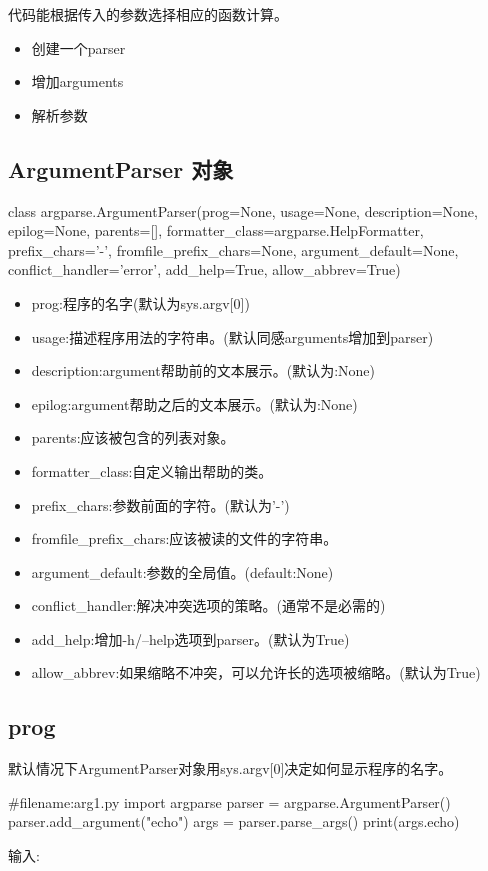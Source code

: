 \begin{python}
代码能根据传入的参数选择相应的函数计算。
\begin{itemize}
\item 创建一个parser
\item 增加arguments
\item 解析参数
\end{itemize}
\subsection{ArgumentParser 对象}
class argparse.ArgumentParser(prog=None, usage=None, description=None, epilog=None, parents=[], formatter\_class=argparse.HelpFormatter, prefix\_chars='-', fromfile\_prefix\_chars=None, argument\_default=None, conflict\_handler='error', add\_help=True, allow\_abbrev=True)
\begin{itemize}
\item prog:程序的名字(默认为sys.argv[0])
\item usage:描述程序用法的字符串。(默认同感arguments增加到parser)
\item description:argument帮助前的文本展示。(默认为:None)
\item epilog:argument帮助之后的文本展示。(默认为:None)
\item parents:应该被包含的列表对象。
\item formatter\_class:自定义输出帮助的类。
\item prefix\_chars:参数前面的字符。(默认为'-')
\item fromfile\_prefix\_chars:应该被读的文件的字符串。
\item argument\_default:参数的全局值。(default:None)
\item conflict\_handler:解决冲突选项的策略。(通常不是必需的)
\item add\_help:增加-h/--help选项到parser。(默认为True)
\item allow\_abbrev:如果缩略不冲突，可以允许长的选项被缩略。(默认为True)
\end{itemize}
\subsection{prog}
默认情况下ArgumentParser对象用sys.argv[0]决定如何显示程序的名字。

#filename:arg1.py
import argparse
parser = argparse.ArgumentParser()
parser.add_argument("echo")
args = parser.parse_args()
print(args.echo)
\end{python}
输入:\newline
